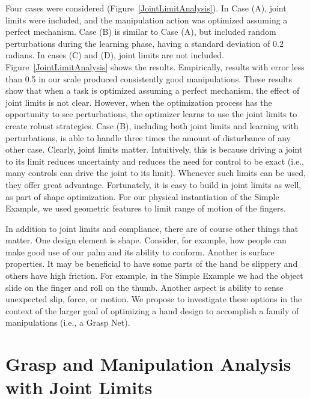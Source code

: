 Four cases were considered (Figure~\ref{JointLimitAnalysis}).   In Case (A), joint limits were included, and the manipulation action was optimized assuming a perfect mechanism.   Case (B) is similar to Case (A), but included random perturbations during the learning phase, having a standard deviation of 0.2 radians.    In cases (C) and (D), joint limits are not included.   Figure~\ref{JointLimitAnalysis} shows the results.   Empirically, results with error less than 0.5 in our scale produced consistently good manipulations.   These results show that when a task is optimized assuming a perfect mechanism, the effect of joint limits is not clear.    However, when the optimization process has the opportunity to see perturbations, the optimizer learns to use the joint limits to create robust strategies.    Case (B), including both joint limits and learning with perturbations, is able to handle three times the amount of disturbance of any other case.      Clearly, joint limits matter.  Intuitively, this is because driving a joint to its limit reduces uncertainty and reduces the need for control to be exact (i.e., many controls can drive the joint to its limit).   Whenever such limits can be used, they offer great advantage.   Fortunately, it is easy to build in joint limits as well, as part of shape optimization.   For our physical instantiation of the Simple Example, we used geometric features to limit range of motion of the fingers.

In addition to joint limits and compliance, there are of course other things that matter.   One design element is shape.   Consider, for example, how people can make good use of our palm and its ability to conform.    Another is surface properties.   It may be beneficial to have some parts of the hand be slippery and others have high friction.   For example, in the Simple Example we had the object slide on the finger and roll on the thumb.   Another aspect is ability to sense unexpected slip, force, or motion.    We propose to investigate these options in the context of the larger goal of optimizing a hand design to accomplish a family of manipulations (i.e., a Grasp Net).

\section{Grasp and Manipulation Analysis with Joint Limits}
   \label{secLimitAnalysis}

